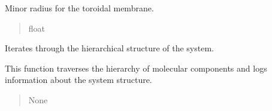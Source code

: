 \documentclass[letterpaper,10pt,english]{sphinxmanual}
\begin{document}
\begin{fulllineitems}
\begin{fulllineitems}
\begin{quote}
\begin{description}
\end{description}\end{quote}

\end{fulllineitems}


\begin{fulllineitems}
\label{\detokenize{src:src.System_Class.System.tor_r}}
\pysigstartsignatures
{}
\pysigstopsignatures
\sphinxAtStartPar
Minor radius for the toroidal membrane.
\begin{quote}\begin{description}
\sphinxAtStartPar
float

\end{description}\end{quote}

\end{fulllineitems}


\begin{fulllineitems}
\label{\detokenize{src:src.System_Class.System.Iterate_Hierarchy}}
\pysigstartsignatures
{}
\pysigstopsignatures
\sphinxAtStartPar
Iterates through the hierarchical structure of the system.

\sphinxAtStartPar
This function traverses the hierarchy of molecular components and logs
information about the system structure.
\begin{quote}\begin{description}
\sphinxAtStartPar
{}

\sphinxAtStartPar
None

\end{description}\end{quote}

\end{fulllineitems}



\end{fulllineitems}
\end{document}
